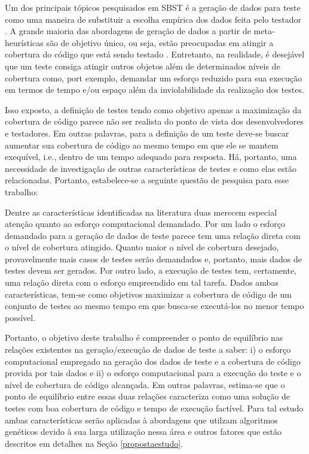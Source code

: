 Um dos principais tópicos pesquisados em SBST é a geração de dados para teste como uma maneira de substituir a escolha empírica dos dados feita pelo testador \cite{mcminn2004search}. A grande maioria das abordagens de geração de dados a partir de meta-heurísticas são de objetivo único, ou seja, estão preocupadas em atingir a cobertura do código que está sendo testado \cite{harman2015achievements}. Entretanto, na realidade, é desejável que um teste consiga atingir outros objetos além de determinados níveis de cobertura como, port exemplo, demandar um esforço reduzido para sua execução em termos de tempo e/ou espaço além da inviolabilidade da realização dos testes\cite{harman2015achievements}.

Isso exposto, a definição de testes tendo como objetivo apenas a maximização da cobertura de código parece não ser realista do ponto de vista dos desenvolvedores e testadores. Em outras palavras, para a definição de um teste deve-se buscar aumentar sua cobertura de código ao mesmo tempo em que ele se mantem exequível, i.e., dentro de um tempo adequado para resposta. Há, portanto, uma necessidade de investigação de outras características de testes e como elas estão relacionadas. Portanto, estabelece-se a seguinte questão de pesquisa para esse trabalho:



Dentre as características identificadas na literatura duas merecem especial atenção quanto ao esforço computacional demandado. Por um lado o esforço demandado para a geração de dados de teste parece tem uma relação direta com o nível de cobertura atingido. Quanto maior o nível de cobertura desejado, provavelmente mais casos de testes serão demandados e, portanto, mais dados de testes devem ser gerados. Por outro lado, a execução de testes tem, certamente, uma relação direta com o esforço empreendido em tal tarefa. Dados ambas características, tem-se como objetivos maximizar a cobertura de código de um conjunto de testes ao mesmo tempo em que busca-se executá-los no menor tempo possível.

Portanto, o objetivo deste trabalho é compreender o ponto de equilíbrio nas relações existentes na geração/execução de dados de teste a saber: i) o esforço computacional empregado na geração dos dados de teste e a cobertura de código provida por tais dados e ii) o esforço computacional para a execução do teste e o nível de cobertura de código alcançada. Em outras palavras, estima-se que o ponto de equilíbrio entre essas duas relações caracteriza como uma solução de testes com boa cobertura de código e tempo de execução factível. Para tal estudo ambas características serão aplicadas à abordagens que utilzam algoritmos genéticos devido à sua larga utilização nessa área e outros fatores que estão  descritos em detalhes na Seção \ref{propostaestudo}.

